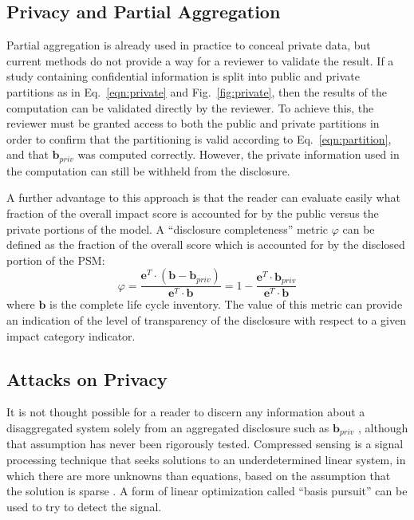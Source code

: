 \subsection{Privacy and Partial Aggregation} 

Partial aggregation is already used in practice to conceal private data, but current methods do not provide a way for a reviewer to validate the result.  If a study containing confidential information is split into public and private partitions as in Eq.~\ref{eqn:private} and Fig.~\ref{fig:private}, then the results of the computation can be validated directly by the reviewer.  To achieve this, the reviewer must be granted access to both the public and private partitions in order to confirm that the partitioning is valid according to Eq.~\ref{eqn:partition}, and that $\mathbf{b}_{priv}$ was computed correctly.  However, the private information used in the computation can still be withheld from the disclosure.

A further advantage to this approach is that the reader can evaluate easily what fraction of the overall impact score is accounted for by the public versus the private portions of the model.  A ``disclosure completeness'' metric $\varphi$ can be defined as the fraction of the overall score which is accounted for by the disclosed portion of the PSM:
\begin{equation}
  \varphi =  \frac{\mathbf{e}^T\cdot(\mathbf{b} - \mathbf{b}_{priv})}{\mathbf{e}^T\cdot\mathbf{b}} = 1 - \frac{\mathbf{e}^T\cdot\mathbf{b}_{priv}}{\mathbf{e}^T\cdot\mathbf{b}}
  \label{eqn:metric}
\end{equation}
where $\mathbf{b}$ is the complete life cycle inventory.  The value of this metric can provide an indication of the level of transparency of the disclosure with respect to a given impact category indicator.  

\subsection{Attacks on Privacy}

It is not thought possible for a reader to discern any information about a disaggregated system solely from an aggregated disclosure such as $\mathbf{b}_{priv}$ \citep[Ch. 3]{UNEP_2011}, although that assumption has never been rigorously tested.  Compressed sensing is a signal processing technique that seeks solutions to an underdetermined linear system, in which there are more unknowns than equations, based on the assumption that the solution is sparse \citep{Donoho_2006}.  A form of linear optimization called ``basis pursuit'' can be used to try to detect the signal.

